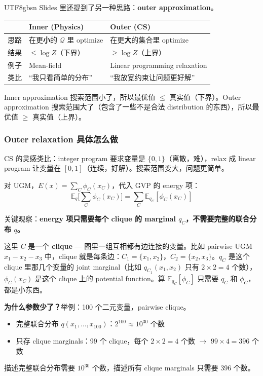 \documentclass[11pt]{article}
\begin{document}
\begin{CJK}{UTF8}{gbsn}
Slides 里还提到了另一种思路：\textbf{outer approximation}。

\begin{center}
\begin{tabular}{l|l|l}
  & \textbf{Inner (Physics)} & \textbf{Outer (CS)} \\
  \hline
  思路 & 在更\textbf{小}的 $\mathcal{Q}$ 里 optimize & 在更\textbf{大}的集合里 optimize \\
  结果 & $\leq \log Z$（下界） & $\geq \log Z$（上界） \\
  例子 & Mean-field & Linear programming relaxation \\
  类比 & ``我只看简单的分布'' & ``我放宽约束让问题更好解'' \\
\end{tabular}
\end{center}

Inner approximation 搜索范围小了，所以最优值 $\leq$ 真实值（下界）。Outer approximation 搜索范围大了（包含了一些不是合法 distribution 的东西），所以最优值 $\geq$ 真实值（上界）。

\subsubsection{Outer relaxation 具体怎么做}

CS 的灵感类比：integer program 要求变量是 $\{0,1\}$（离散，难），relax 成 linear program 让变量在 $[0,1]$（连续，好解）。搜索范围变大，问题更简单。

对 UGM，$E(x) = \sum_C \phi_C(x_C)$，代入 GVP 的 energy 项：
\[
  \mathbb{E}_q\Big[\sum_C \phi_C(x_C)\Big] = \sum_C \mathbb{E}_{q_C}[\phi_C(x_C)]
\]

关键观察：\textbf{energy 项只需要每个 clique 的 marginal $q_C$，不需要完整的联合分布 $q$。}

这里 $C$ 是一个 \textbf{clique} --- 图里一组互相都有边连接的变量。比如 pairwise UGM $x_1 - x_2 - x_3$ 中，clique 就是每条边：$C_1 = \{x_1, x_2\}$，$C_2 = \{x_2, x_3\}$。$q_C$ 是这个 clique 里那几个变量的 joint marginal（比如 $q_{C_1}(x_1, x_2)$ 只有 $2 \times 2 = 4$ 个数），$\phi_C(x_C)$ 是这个 clique 上的 potential function。算 $\mathbb{E}_{q_C}[\phi_C]$ 只需要 $q_C$ 和 $\phi_C$，都是小东西。

\textbf{为什么参数少了？}举例：100 个二元变量，pairwise clique。
\begin{itemize}[nosep]
  \item 完整联合分布 $q(x_1, \dots, x_{100})$：$2^{100} \approx 10^{30}$ 个数
  \item 只存 clique marginals：99 个 clique，每个 $2 \times 2 = 4$ 个数 $\to$ $99 \times 4 = 396$ 个数
\end{itemize}
描述完整联合分布需要 $10^{30}$ 个数，描述所有 clique marginals 只需要 396 个数。


\end{CJK}
\end{document}

